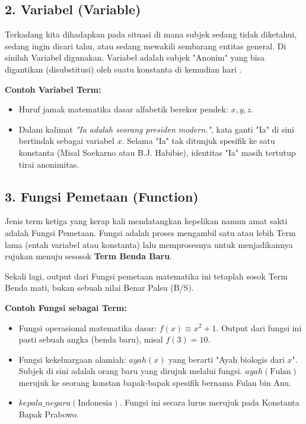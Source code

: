 \subsection{2. Variabel (Variable)}

Terkadang kita dihadapkan pada situasi di mana subjek sedang tidak diketahui, sedang ingin dicari tahu, atau sedang mewakili sembarang entitas general. Di sinilah Variabel digunakan. Variabel adalah subjek "Anonim" yang bisa digantikan (disubstitusi) oleh suatu konstanta di kemudian hari \cite{wiki_first_order_logic}.

\begin{contoh}
\textbf{Contoh Variabel Term:}
\begin{itemize}
    \item Huruf jamak matematika dasar alfabetik berekor pendek: $x, y, z$.
    \item Dalam kalimat \textit{"Ia adalah seorang presiden modern."}, kata ganti "Ia" di sini bertindak sebagai variabel $x$. Selama "Ia" tak ditunjuk spesifik ke satu konstanta (Misal Soekarno atau B.J. Habibie), identitas "Ia" masih tertutup tirai anonimitas. 
\end{itemize}
\end{contoh}

\subsection{3. Fungsi Pemetaan (Function)}

Jenis term ketiga yang kerap kali mendatangkan kepelikan namun amat sakti adalah Fungsi Pemetaan. Fungsi adalah proses mengambil satu atau lebih Term lama (entah variabel atau konstanta) lalu memprosesnya untuk menjadikannya rujukan menuju sesosok \textbf{Term Benda Baru}.

Sekali lagi, output dari Fungsi pemetaan matematika ini tetaplah sosok Term Benda mati, bukan sebuah nilai Benar Palsu (B/S).

\begin{contoh}
\textbf{Contoh Fungsi sebagai Term:}
\begin{itemize}
    \item Fungsi operasional matematika dasar: $f(x) \equiv x^2 + 1$. Output dari fungsi ini pasti sebuah angka (benda baru), misal $f(3) = 10$.
    \item Fungsi kekeluargaan alamiah: $ayah(x)$ yang berarti "Ayah biologis dari $x$". Subjek di sini adalah orang baru yang dirujuk melalui fungsi. $ayah(\text{Fulan})$ merujuk ke seorang konstan bapak-bapak spesifik bernama Fulan bin Anu. 
    \item $kepala\_negara(\text{Indonesia})$. Fungsi ini secara lurus merujuk pada Konstanta Bapak Prabowo.
\end{itemize}
\end{contoh}
